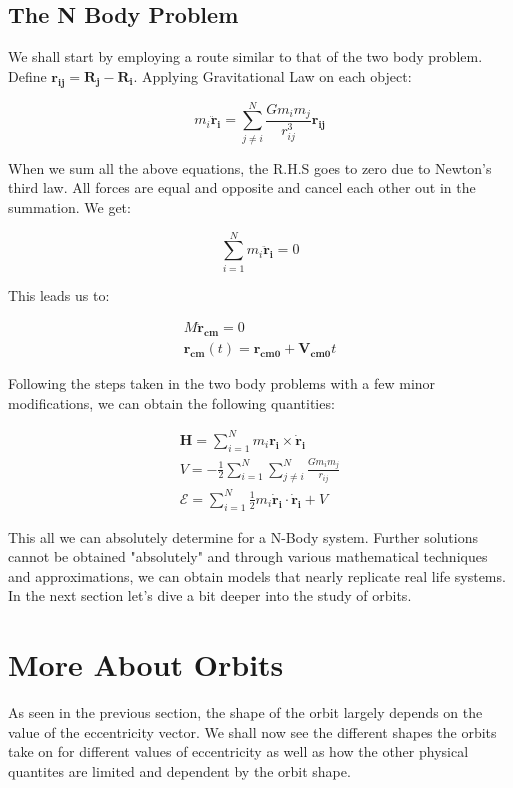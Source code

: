 \documentclass[12pt, letterpaper]{article}
\begin{document}
\subsection{The N Body Problem}

We shall start by employing a route similar to that of the two body problem. Define $ \mathbf{r_{ij}} = \mathbf{R_{j}} - \mathbf{R_{i}}$. Applying Gravitational Law on each object:

\begin{displaymath}
m_i\mathbf{\ddot{r}_i} = \sum_{j \neq i}^{N} \frac{Gm_im_j}{r_{ij}^3}\mathbf{r_{ij}}
\end{displaymath}

When we sum all the above equations, the R.H.S goes to zero due to Newton's third law. All forces are equal and opposite and cancel each other out in the summation. We get:

\begin{displaymath}
\sum_{i=1}^{N} m_i\mathbf{\ddot{r}_i} = 0
\end{displaymath}

This leads us to:

\begin{gather*}
M\mathbf{\ddot{r}_{cm}} = 0\\
\mathbf{r_{cm}}(t) = \mathbf{r_{cm0}} + \mathbf{V_{cm0}}t
\end{gather*}

Following the steps taken in the two body problems with a few minor modifications, we can obtain the following quantities:

\begin{gather*}
\mathbf{H} = \sum_{i=1}^{N} m_i\mathbf{r_i}\times\mathbf{\dot{r}_i}\\
V = -\frac{1}{2}\sum_{i=1}^{N}\sum_{j \neq i}^{N}\frac{Gm_im_j}{r_{ij}}\\
\mathcal{E} = \sum_{i=1}^{N}\frac{1}{2}m_i\mathbf{\dot{r}_i}\cdot\mathbf{\dot{r}_i} + V
\end{gather*}

This all we can absolutely determine for a N-Body system. Further solutions cannot be obtained "absolutely" and through various mathematical techniques and approximations, we can obtain models that nearly replicate real life systems. In the next section let's dive a bit deeper into the study of orbits.

\newpage

\section{More About Orbits}
As seen in the previous section, the shape of the orbit largely depends on the value of the eccentricity vector. We shall now see the different shapes the orbits take on for different values of eccentricity as well as how the other physical quantites are limited and dependent by the orbit shape.
\end{document}
